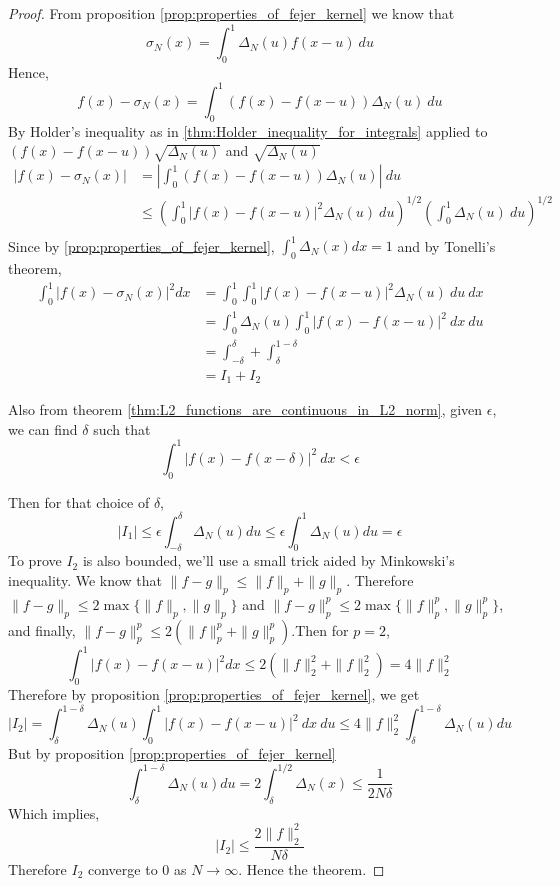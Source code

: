 \begin{proof}
  From proposition \ref{prop:properties_of_fejer_kernel} we know that
  \begin{displaymath}
    \sigma_N(x) = \int_0^1 \Delta_N(u)f(x-u) \ du 
  \end{displaymath}
  Hence,
  $$ f(x) - \sigma_N(x) = \int_0^1 (f(x) - f(x-u))\Delta_N(u) \ du $$ 
  By Holder's inequality as in \ref{thm:Holder_inequality_for_integrals} applied to $(f(x) - f(x-u))\sqrt{\Delta_N(u)}$ and $\sqrt{\Delta_N(u)}$ 
  \begin{align*}
    |f(x) - \sigma_N(x)| &= \left| \int_0^1 (f(x) - f(x-u))\Delta_N(u) \right| \ du \\
          &\le \left( \int_0^1 |f(x) - f(x-u)|^{2} \Delta_N(u) \ du \right)^{1/2} \left( \int_0^1 \Delta_N(u) \ du \right)^{1/2} \\
  \end{align*}
  Since by \ref{prop:properties_of_fejer_kernel}, $\int_0^1 \Delta_N(x) dx = 1$ and by Tonelli's theorem, 
  \begin{align*}
    \int_0^1 |f(x) - \sigma_N(x)|^2 dx &= \int_0^1 \int_0^1 |f(x) - f(x-u)|^{2} \Delta_N(u) \ du  \ dx \\
          & = \int_0^1 \Delta_N(u) \int_0^1 |f(x) - f(x-u)|^{2} \ dx  \ du \\
          & = \int_{-\delta}^\delta + \int_\delta^{1-\delta} \\
          & = I_1 + I_2
  \end{align*}

  Also from theorem \ref{thm:L2_functions_are_continuous_in_L2_norm}, given $\epsilon$, we can find $\delta$ such that 
  $$ \int_0^1|f(x) - f(x-\delta)|^2 \ dx < \epsilon$$

  Then for that choice of $\delta$,
  $$|I_1| \le \epsilon \int_{-\delta}^\delta \Delta_N(u) du \le \epsilon \int_0^1 \Delta_N(u) du = \epsilon$$
  To prove $I_2$ is also bounded, we'll use a small trick aided by Minkowski's inequality. We know that $\|f-g\|_p \le \|f\|_p + \|g\|_p$. Therefore $\|f-g\|_p \le 2\max\{\|f\|_p, \|g\|_p\}$ and $\|f-g\|_p^p \le 2\max\{\|f\|_p^p, \|g\|_p^p\}$, and finally, $\|f-g\|_p^p \le 2(\|f\|_p^p + \|g\|_p^p)$.Then for $p=2$, 
  $$ \int_0^1 |f(x) - f(x-u)|^2 dx \le 2(\|f\|_2^2 + \|f\|_2^2) = 4\|f\|_2^2$$
  Therefore by proposition \ref{prop:properties_of_fejer_kernel}, we get 
  $$|I_2| = \int_\delta^{1-\delta} \Delta_N(u) \int_0^1 |f(x) - f(x-u)|^{2} \ dx  \ du \le 4\|f\|_2^2 \int_\delta^{1-\delta}\Delta_N(u) du$$
  But by proposition \ref{prop:properties_of_fejer_kernel} 
  $$ \int_\delta^{1-\delta}\Delta_N(u)du = 2\int_\delta^{1/2}\Delta_N(x) \le \frac{1}{2N\delta}$$
  Which implies, 
  $$ |I_2| \le \frac{2\|f\|_2^2}{N\delta}$$
  Therefore $I_2$ converge to $0$ as $N \to \infty$. Hence the theorem.
\end{proof}

